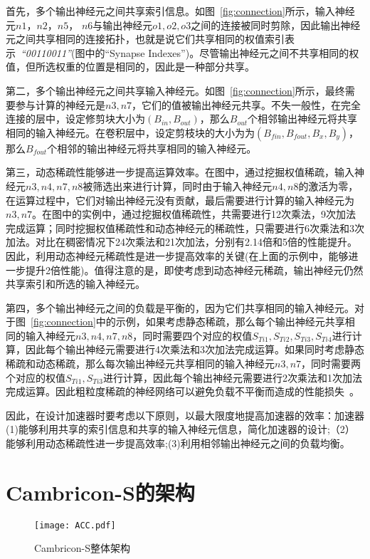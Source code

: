 首先，多个输出神经元之间共享索引信息。如图~\ref{fig:connection}所示，输入神经元$n1$，$n2$，$n5$， $n6$与输出神经元$o1, o2, o3$之间的连接被同时剪除，因此输出神经元之间共享相同的连接拓扑，也就是说它们共享相同的权值索引表示~\emph{“00110011”}(图中的“Synapse Indexes”)。尽管输出神经元之间不共享相同的权值，但所选权重的位置是相同的，因此是一种部分共享。

第二，多个输出神经元之间共享输入神经元。如图~\ref{fig:connection}所示，最终需要参与计算的神经元是$n3, n7$，它们的值被输出神经元共享。不失一般性，在完全连接的层中，设定修剪块大小为$(B_{in},B_{out})$，那么$B_{out}$个相邻输出神经元将共享相同的输入神经元。在卷积层中，设定剪枝块的大小为为$(B_{fin},B_{fout},B_x,B_y)$，那么$B_{fout}$个相邻的输出神经元将共享相同的输入神经元。

第三，动态稀疏性能够进一步提高运算效率。在图中，通过挖掘权值稀疏，输入神经元$n3, n4, n7, n8$被筛选出来进行计算，同时由于输入神经元$n4, n8$的激活为零，在运算过程中，它们对输出神经元没有贡献，最后需要进行计算的输入神经元为$n3, n7$。在图中的实例中，通过挖掘权值稀疏性，共需要进行12次乘法，9次加法完成运算；同时挖掘权值稀疏性和动态神经元的稀疏性，只需要进行6次乘法和3次加法。对比在稠密情况下24次乘法和21次加法，分别有2.14倍和5倍的性能提升。因此，利用动态神经元稀疏性是进一步提高效率的关键(在上面的示例中，能够进一步提升2倍性能)。值得注意的是，即使考虑到动态神经元稀疏，输出神经元仍然共享索引和所选的输入神经元。

第四，多个输出神经元之间的负载是平衡的，因为它们共享相同的输入神经元。对于图~\ref{fig:connection}中的示例，如果考虑静态稀疏，那么每个输出神经元共享相同的输入神经元$n3, n4, n7, n8$，同时需要四个对应的权值$S_{Ti1}, S_{Ti2}, S_{Ti3}, S_{Ti4}$进行计算，因此每个输出神经元需要进行4次乘法和3次加法完成运算。如果同时考虑静态稀疏和动态稀疏，那么每次输出神经元共享相同的输入神经元$n3, n7$，同时需要两个对应的权值$S_{Ti1}, S_{Ti3}$进行计算，因此每个输出神经元需要进行2次乘法和1次加法完成运算。因此粗粒度稀疏的神经网络可以避免负载不平衡而造成的性能损失~\cite{han2017ese}。

因此，在设计加速器时要考虑以下原则，以最大限度地提高加速器的效率：加速器(1)能够利用共享的索引信息和共享的输入神经元信息，简化加速器的设计;（2）能够利用动态稀疏性进一步提高效率;(3)利用相邻输出神经元之间的负载均衡。


\section{Cambricon-S的架构}
\begin{figure}[h]
\centering
\texttt{[image: ACC.pdf]}
\caption{Cambricon-S整体架构}
\label{fig:acc}
\end{figure}

